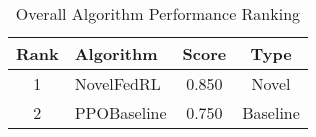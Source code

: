 \begin{table}[htbp]
\centering
\caption{Overall Algorithm Performance Ranking}
\label{tab:performance_ranking}
\begin{tabular}{|c|l|c|c|}
\hline
\textbf{Rank} & \textbf{Algorithm} & \textbf{Score} & \textbf{Type} \\
\hline
1 & NovelFedRL & 0.850 & Novel \\
\hline
2 & PPOBaseline & 0.750 & Baseline \\
\hline
\end{tabular}
\end{table}